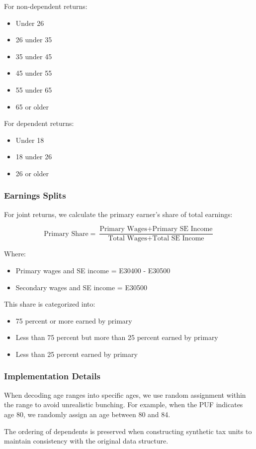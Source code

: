 For non-dependent returns:
\begin{itemize}
    \item Under 26
    \item 26 under 35
    \item 35 under 45
    \item 45 under 55
    \item 55 under 65
    \item 65 or older
\end{itemize}

For dependent returns:
\begin{itemize}
    \item Under 18
    \item 18 under 26
    \item 26 or older
\end{itemize}

\subsubsection{Earnings Splits}

For joint returns, we calculate the primary earner's share of total earnings:

\[ \text{Primary Share} = \frac{\text{Primary Wages} + \text{Primary SE Income}}{\text{Total Wages} + \text{Total SE Income}} \]

Where:
\begin{itemize}
    \item Primary wages and SE income = E30400 - E30500
    \item Secondary wages and SE income = E30500
\end{itemize}

This share is categorized into:
\begin{itemize}
    \item 75 percent or more earned by primary
    \item Less than 75 percent but more than 25 percent earned by primary
    \item Less than 25 percent earned by primary
\end{itemize}

\subsubsection{Implementation Details}

When decoding age ranges into specific ages, we use random assignment within the range to avoid unrealistic bunching. For example, when the PUF indicates age 80, we randomly assign an age between 80 and 84.

The ordering of dependents is preserved when constructing synthetic tax units to maintain consistency with the original data structure.